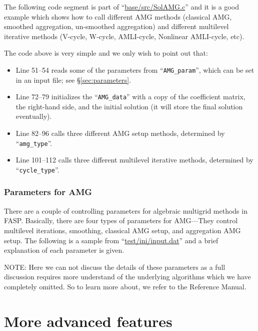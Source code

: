 \documentclass[11pt]{memoir}
\begin{document}
The following code segment is part of ``\url{base/src/SolAMG.c}'' and it is a good example which shows how to call different AMG methods (classical AMG, smoothed aggregation, un-smoothed aggregation) and different multilevel iterative methods (V-cycle, W-cycle, AMLI-cycle, Nonlinear AMLI-cycle, etc).
%

%
The code above is very simple and we only wish to point out that:
%
\begin{itemize}
\item Line 51--54 reads some of the parameters from ``\verb|AMG_param|'', which can be set in an input file; see \S\ref{sec:parameters}.
\item Line 72--79 initializes the ``\verb|AMG_data|'' with a copy of the coefficient matrix, the right-hand side, and the initial solution (it will store the final solution eventually).
\item Line 82--96 calls three different AMG setup methods, determined by ``\verb|amg_type|''.
\item Line 101--112 calls three different multilevel iterative methods, determined by ``\verb|cycle_type|''.
\end{itemize}

\subsection{Parameters for AMG}

There are a couple of controlling parameters for algebraic multigrid methods in FASP. Basically, there are four types of parameters for AMG---They control multilevel iterations, smoothing, classical AMG setup, and aggregation AMG setup. The following is a sample from ``\url{test/ini/input.dat}'' and a brief explanation of each parameter is given.
%

%

\begin{snugshade}\noindent
NOTE: Here we can not discuss the details of these parameters as a full discussion requires more understand of the underlying algorithms which we have completely omitted. So to learn more about, we refer to the Reference Manual.
\end{snugshade}

\chapter{More  advanced features}\label{ch:advanced}
\end{document}
